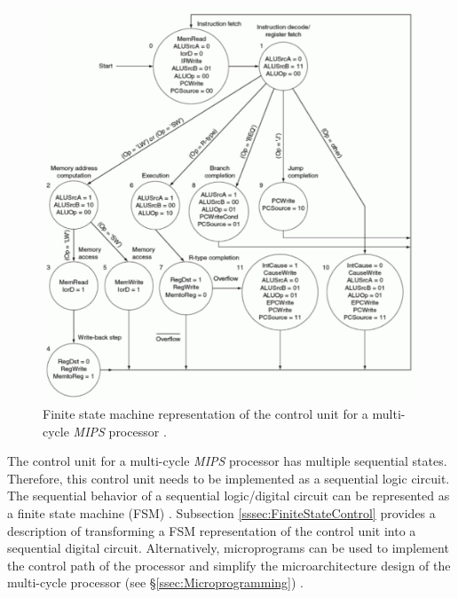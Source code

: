\begin{figure}[h]
\centering 
\includegraphics[width=6in]{./pics/multi-cycle-processor-fsm-ctrl-logic}
\caption{Finite state machine representation of the control unit for a multi-cycle {\it MIPS} processor \cite{Patterson2005,Patterson2005a}.}
\label{fig:multicycleprocessorfsmctrllogic}
\end{figure}

The control unit for a multi-cycle {\it MIPS} processor has multiple sequential states. Therefore, this control unit needs to be implemented as a sequential logic circuit. The sequential behavior of a sequential logic/digital circuit can be represented as a finite state machine (FSM) \cite{Patterson2005a}. Subsection \ref{sssec:FiniteStateControl} provides a description of transforming a FSM representation of the control unit into a sequential digital circuit. Alternatively, microprograms can be used to implement the control path of the processor and simplify the microarchitecture design of the multi-cycle processor (see \S\ref{ssec:Microprogramming}) \cite{Patterson2005}. \\


